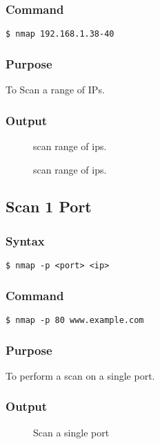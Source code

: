 \documentclass[11pt]{article}
\begin{document}
\subsubsection*{Command}
\begin{verbatim}
$ nmap 192.168.1.38-40
\end{verbatim}

\subsubsection*{Purpose}
To Scan a range of IPs.

\subsubsection*{Output}
\begin{figure}[H]
    \centering
    \caption{scan range of ips. }
    \label{fig:1}
\end{figure}
\begin{figure}[H]
    \centering
    \caption{scan range of ips. }
    \label{fig:1}
\end{figure}

\subsection{Scan 1 Port}

\subsubsection{Syntax}
\begin{verbatim}
$ nmap -p <port> <ip>
\end{verbatim}

\subsubsection*{Command}
\begin{verbatim}
$ nmap -p 80 www.example.com
\end{verbatim}

\subsubsection*{Purpose}
To perform a scan on a single port.

\subsubsection*{Output}
\begin{figure}[H]
    \centering
    \caption{Scan a single port}
    \label{fig:1}
\end{figure}
\end{document}
